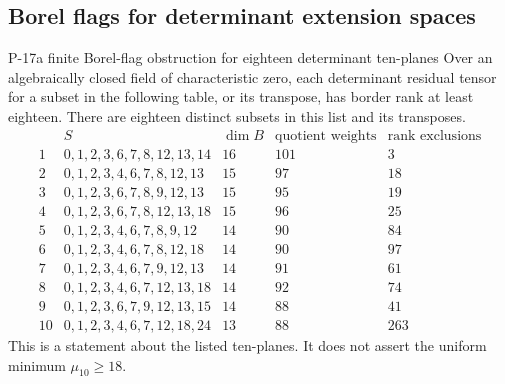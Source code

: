 \subsection{Borel flags for determinant extension spaces}
\begin{finding}{P-17}{a finite Borel-flag obstruction for eighteen determinant ten-planes}
Over an algebraically closed field of characteristic zero, each
determinant residual tensor for a subset in the following table, or
its transpose, has border rank at least eighteen. There are eighteen
distinct subsets in this list and its transposes.
\[
\begin{array}{c|l|r|r|r}
 &S&\dim B&\text{quotient weights}&\text{rank exclusions}\\\hline
 1&0,1,2,3,6,7,8,12,13,14&16&101&3\\
 2&0,1,2,3,4,6,7,8,12,13&15&97&18\\
 3&0,1,2,3,6,7,8,9,12,13&15&95&19\\
 4&0,1,2,3,6,7,8,12,13,18&15&96&25\\
 5&0,1,2,3,4,6,7,8,9,12&14&90&84\\
 6&0,1,2,3,4,6,7,8,12,18&14&90&97\\
 7&0,1,2,3,4,6,7,9,12,13&14&91&61\\
 8&0,1,2,3,4,6,7,12,13,18&14&92&74\\
 9&0,1,2,3,6,7,9,12,13,15&14&88&41\\
 10&0,1,2,3,4,6,7,12,18,24&13&88&263
\end{array}
\]
This is a statement about the listed ten-planes. It does not assert
the uniform minimum $\mu_{10}\ge18$.
\end{finding}
